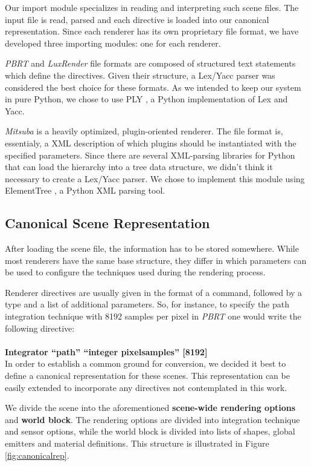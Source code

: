 Our import module specializes in reading and interpreting such scene files. The
input file is read, parsed and each directive is loaded into our canonical
representation. Since each renderer has its own proprietary file format, we have
developed three importing modules: one for each renderer.

\textit{PBRT} and \textit{LuxRender} file formats are composed of structured
text statements which define the directives. Given their structure, a Lex/Yacc
parser was considered the best choice for these formats. As we intended to keep
our system in pure Python, we chose to use PLY \cite{ply}, a Python
implementation of Lex and Yacc.

\textit{Mitsuba} is a heavily optimized, plugin-oriented renderer. The file
format is, essentialy, a XML description of which plugins should be instantiated
with the specified parameters. Since there are several
XML-parsing libraries for Python that can load the hierarchy into a tree data
structure, we didn't think it necessary to create a Lex/Yacc parser. We chose to
implement this module using ElementTree \cite{ET}, a Python XML parsing tool.

\subsection{Canonical Scene Representation}
After loading the scene file, the information has to be
stored somewhere. While most renderers have the same base structure, they differ
in which parameters can be used to configure the techniques used during the
rendering process.

Renderer directives are usually given in the format of a command, followed by a
type and a list of additional parameters. So, for instance, to specify the path
integration technique with 8192 samples per pixel in \textit{PBRT} one would
write the following directive: \\ \\
\indent \textbf{Integrator ``path'' ``integer pixelsamples'' [8192]}\\

In order to establish a common ground for conversion, we decided it best to
define a canonical representation for these scenes. This representation can be
easily extended to incorporate any directives not contemplated in this work.

We divide the scene into the aforementioned \textbf{scene-wide rendering options} and \textbf{world
block}. The rendering options are divided into integration technique and sensor
options, while the world block is divided into lists of shapes, global emitters
and material definitions. This structure is illustrated in Figure
\ref{fig:canonicalrep}.

